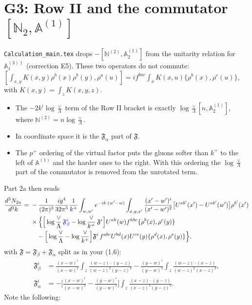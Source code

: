 \documentclass[10pt]{article}
\numberwithin{equation}{section}
\def\mf#1{\mathbb{#1}}
\newcommand{\new}[1]{{\color{blue}#1}}
\begin{document}
\section{G3: Row II and the commutator \texorpdfstring{$[\mf N_2,\mf A^{(1)}]$}{[N2,A1]}}\label{sec:G3}
\texttt{Calculation\_main.tex} drops $-[\mf N^{(2)},\mf A^{(1)}_2]$ from the unitarity relation for $\mf A^{(3)\dagger}_1$ (correction E5). These two operators do not commute: $[\int_{x,y}K(x,y)\rho^b(x)\rho^b(y),\rho^a(u)]=if^{bac}\int_xK(x,u)\{\rho^b(x),\rho^c(u)\}$, with $K(x,y)=\int_zK(x,y,z)$.
\begin{itemize}
\item The $-2k^i\log\frac{\vee}{\Lambda}$ term of the Row II bracket is exactly $\log\frac{\vee}{\Lambda}[n,\mf A^{(1)}_2]$, where $\mf N^{(2)}=n\log\frac{\vee}{\Lambda}$.
\item In coordinate space it is the $\mathfrak F_\alpha$ part of $\mathfrak F$.
\item The $p^+$ ordering of the virtual factor puts the gluons softer than $k^+$ to the left of $\mf A^{(1)}$ and the harder ones to the right. With this ordering the $\log\frac{\vee}{\Lambda}$ part of the commutator is removed from the unrotated term.
\end{itemize}
Part 2a then reads
\begin{align}
\frac{d^3N_{2a}}{d^3k}={}&-\frac{1}{(2\pi)^3}\frac{ig^4}{32\pi^5}\frac{1}{k^+}\int_{w,w'}e^{-ik\cdot(w'-w)}\int_{x,y,x'}\frac{(x'-w')^i}{(x'-w')^2}\big[U^{ab'}(x')-U^{ab'}(w')\big]\rho^{b'}(x')\notag\\
&\times\Big\{\Big[\log\frac{\vee}{\Lambda}\,\new{\mathfrak F^i_\beta}-\log\frac{\vee}{k^+}\,\mathfrak F^i\Big]U^{ah}(w)f^{hbc}\{\rho^b(x),\rho^c(y)\}\notag\\
&\quad-\Big[\log\frac{\vee}{\Lambda}-\log\frac{\vee}{k^+}\Big]\mathfrak F^i\,f^{abc}U^{bd}(x)U^{ce}(y)\{\rho^d(x),\rho^e(y)\}\Big\},
\end{align}
with $\mathfrak F=\mathfrak F_\beta+\mathfrak F_\alpha$ split as in your (1.6):
\begin{align}
\mathfrak F^i_\beta&=\frac{(x-w)^i}{(x-w)^2}\int_z\frac{(w-z)\cdot(y-z)}{(w-z)^2(y-z)^2}-\frac{(y-w)^i}{(y-w)^2}\int_z\frac{(w-z)\cdot(x-z)}{(w-z)^2(x-z)^2},\\
\mathfrak F^i_\alpha&=-\Big[\frac{(x-w)^i}{(x-w)^2}-\frac{(y-w)^i}{(y-w)^2}\Big]\int_z\frac{(x-z)\cdot(y-z)}{(x-z)^2(y-z)^2}.
\end{align}
Note the following:
\end{document}
